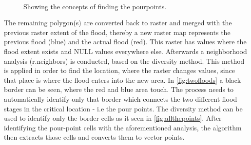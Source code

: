 \begin{figure}[h!]
  \myfloatalign
   \quad
   \\
  \caption{Showing the concepts of finding the pourpoints.}
  \label{fig:pourpoints}
\end{figure}

The remaining polygon(s) are converted back to raster and merged with the previous raster extent of the flood, thereby a new raster map represents the previous flood (blue) and the actual flood (red). This raster has values where the flood extent exists and NULL values everywhere else.
Afterwards a neighborhood analysis (r.neighbors) is conducted, based on the diversity method. This method is applied in order to find the location, where the raster changes values, since that place is where the flood enters into the new area. In \autoref{fig:twofloods} a black border can be seen, where the red and blue area touch. The process needs to automatically identify only that border which connects the two different flood stages in the critical location - i.e the pour points. The diversity method can be used to identify only the border cells as it seen in \autoref{fig:allthepoints}.
After identifying the pour-point cells with the aforementioned analysis, the algorithm then extracts those cells and converts them to vector points. \\

